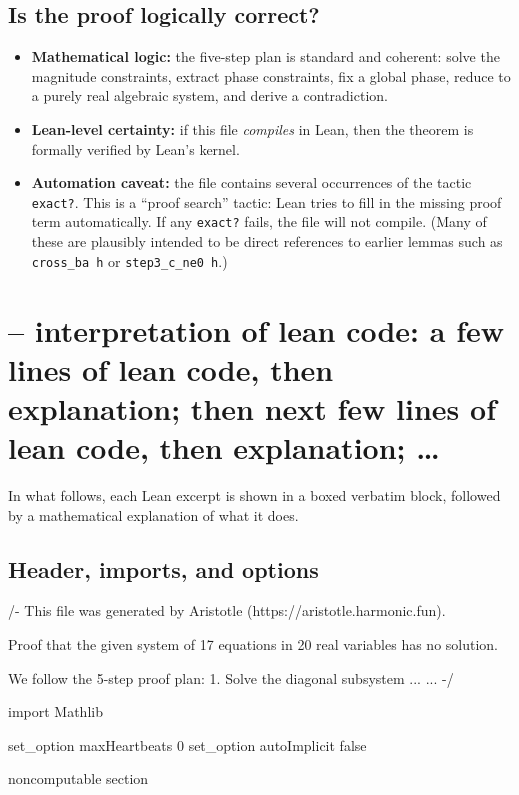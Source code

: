 \documentclass[11pt]{article}
\begin{document}
\subsection*{Is the proof logically correct?}

\begin{itemize}
\item \textbf{Mathematical logic:} the five-step plan is standard and coherent: solve the magnitude constraints, extract phase constraints, fix a global phase, reduce to a purely real algebraic system, and derive a contradiction.
\item \textbf{Lean-level certainty:} if this file \emph{compiles} in Lean, then the theorem is formally verified by Lean's kernel.
\item \textbf{Automation caveat:} the file contains several occurrences of the tactic \texttt{exact?}.  This is a ``proof search'' tactic: Lean tries to fill in the missing proof term automatically.  If any \texttt{exact?} fails, the file will not compile.  (Many of these are plausibly intended to be direct references to earlier lemmas such as \texttt{cross\_ba h} or \texttt{step3\_c\_ne0 h}.)
\end{itemize}

\section*{-- interpretation of lean code: a few lines of lean code, then explanation; then next few lines of lean code, then explanation; \dots}

In what follows, each Lean excerpt is shown in a boxed verbatim block, followed by a mathematical explanation of what it does.

\subsection*{Header, imports, and options}

\begin{LeanCode}
/-
This file was generated by Aristotle (https://aristotle.harmonic.fun).

Proof that the given system of 17 equations in 20 real variables has no solution.

We follow the 5-step proof plan:
1.  Solve the diagonal subsystem ...
...
-/

import Mathlib

set_option maxHeartbeats 0
set_option autoImplicit false

noncomputable section
\end{LeanCode}
\end{document}
